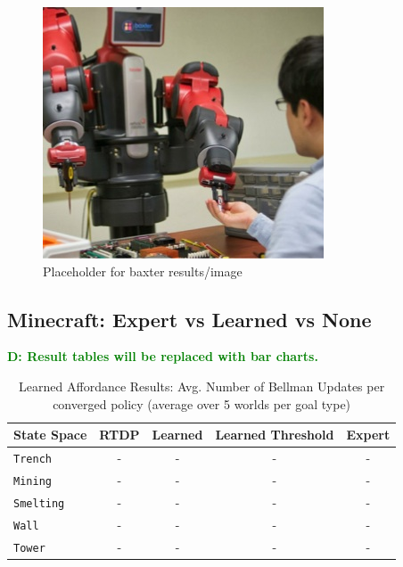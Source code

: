 \documentclass[conference]{IEEEtran}
\newcommand{\dnote}[1]{\textcolor{Green}{\textbf{D: #1}}}
\begin{document}
\begin{figure}[H]
\centering
\includegraphics[scale=0.195]{figures/baxter_temp.jpg}%
  \caption{Placeholder for baxter results/image}
  \label{fig:baxter_results}
\end{figure}

\subsection{Minecraft: Expert vs Learned vs None}

\dnote{Result tables will be replaced with bar charts.}

\begin{table}[H]
\centering
\begin{tabular}{ l || c c c c }
  State Space & RTDP & Learned & Learned Threshold & Expert 	\\ \hline
  \texttt{Trench}  	& 	-	&	-		&	-	&	-	\\
  \texttt{Mining}  	& 	-	&	-		&	-	&	-  	\\
  \texttt{Smelting}  	& 	-	&	-		&	-	&	-  	\\
  \texttt{Wall}  		& 	-	&	-		&	-	&	-	\\
  \texttt{Tower}  		& 	-	&	-		&	-	&	- 	\\
\end{tabular}
\caption{Learned Affordance Results: Avg. Number of Bellman Updates per converged policy (average over 5 worlds per goal type)}
\label{table:minecraft_results_bellman}
\end{table}
\end{document}
